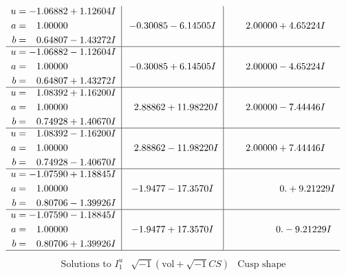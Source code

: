 \documentclass[1p]{elsarticle_modified}
\theoremstyle{definition}
\newcommand{\I}{\sqrt{-1}}
\begin{document}
$$\begin{array}{c|c|c}
\begin{aligned}
u &= -1.06882 + 1.12604 I \\
a &= \phantom{-}1.00000\phantom{ +0.000000I} \\
b &= \phantom{-}0.64807 - 1.43272 I\end{aligned}
 & -0.30085 - 6.14505 I & \phantom{-}2.00000 + 4.65224 I \\ \hline\begin{aligned}
u &= -1.06882 - 1.12604 I \\
a &= \phantom{-}1.00000\phantom{ +0.000000I} \\
b &= \phantom{-}0.64807 + 1.43272 I\end{aligned}
 & -0.30085 + 6.14505 I & \phantom{-}2.00000 - 4.65224 I \\ \hline\begin{aligned}
u &= \phantom{-}1.08392 + 1.16200 I \\
a &= \phantom{-}1.00000\phantom{ +0.000000I} \\
b &= \phantom{-}0.74928 + 1.40670 I\end{aligned}
 & \phantom{-}2.88862 + 11.98220 I & \phantom{-}2.00000 - 7.44446 I \\ \hline\begin{aligned}
u &= \phantom{-}1.08392 - 1.16200 I \\
a &= \phantom{-}1.00000\phantom{ +0.000000I} \\
b &= \phantom{-}0.74928 - 1.40670 I\end{aligned}
 & \phantom{-}2.88862 - 11.98220 I & \phantom{-}2.00000 + 7.44446 I \\ \hline\begin{aligned}
u &= -1.07590 + 1.18845 I \\
a &= \phantom{-}1.00000\phantom{ +0.000000I} \\
b &= \phantom{-}0.80706 - 1.39926 I\end{aligned}
 & -1.9477 - 17.3570 I & \phantom{-0.000000 -}0. + 9.21229 I \\ \hline\begin{aligned}
u &= -1.07590 - 1.18845 I \\
a &= \phantom{-}1.00000\phantom{ +0.000000I} \\
b &= \phantom{-}0.80706 + 1.39926 I\end{aligned}
 & -1.9477 + 17.3570 I & \phantom{-0.000000 } 0. - 9.21229 I\\
 \hline 
 \end{array}$$\newpage$$\begin{array}{c|c|c}  
\text{Solutions to }I^u_{1}& \I (\text{vol} + \sqrt{-1}CS) & \text{Cusp shape}\\

\end{array}$$
\end{document}
